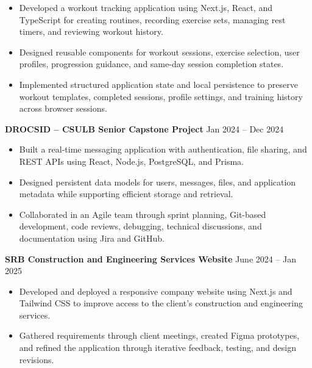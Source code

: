 \documentclass[a4paper,10pt]{article}
\newcommand{\dateright}[1]{%
  \hfill{\small\textnormal{#1}}%
}
\begin{document}
\begin{itemize}
  \item Developed a workout tracking application using Next.js, React, and TypeScript for creating routines, recording exercise sets, managing rest timers, and reviewing workout history.
  
  \item Designed reusable components for workout sessions, exercise selection, user profiles, progression guidance, and same-day session completion states.
  
  \item Implemented structured application state and local persistence to preserve workout templates, completed sessions, profile settings, and training history across browser sessions.
\end{itemize}

\vspace{2pt}

\textbf{DROCSID -- CSULB Senior Capstone Project}
\dateright{Jan 2024 -- Dec 2024}

\begin{itemize}
  \item Built a real-time messaging application with authentication, file sharing, and REST APIs using React, Node.js, PostgreSQL, and Prisma.
  
  \item Designed persistent data models for users, messages, files, and application metadata while supporting efficient storage and retrieval.
  
  \item Collaborated in an Agile team through sprint planning, Git-based development, code reviews, debugging, technical discussions, and documentation using Jira and GitHub.
\end{itemize}

\vspace{2pt}

\textbf{SRB Construction and Engineering Services Website}
\dateright{June 2024 -- Jan 2025}

\begin{itemize}
  \item Developed and deployed a responsive company website using Next.js and Tailwind CSS to improve access to the client's construction and engineering services.
  
  \item Gathered requirements through client meetings, created Figma prototypes, and refined the application through iterative feedback, testing, and design revisions.
\end{itemize}
\end{document}
